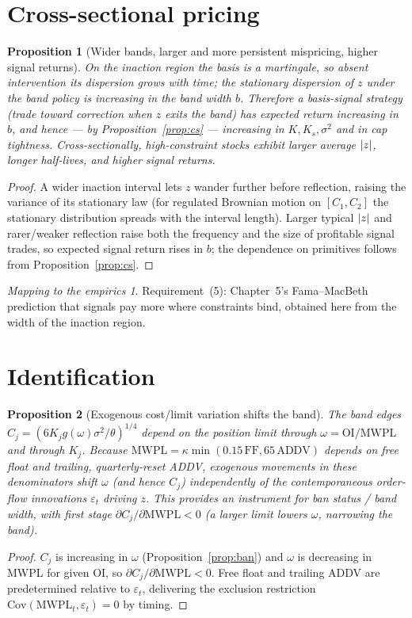 \documentclass[11pt,a4paper]{article}
\DeclarePairedDelimiter{\abs}{\lvert}{\rvert}
\theoremstyle{plain}
\newtheorem{proposition}{Proposition}
\theoremstyle{definition}
\theoremstyle{remark}
\newtheorem*{takeaway}{Mapping to the empirics}
\begin{document}
\section{Cross-sectional pricing}\label{sec:xs}
\begin{proposition}[Wider bands, larger and more persistent mispricing, higher signal returns]\label{prop:xs}
On the inaction region the basis is a martingale, so absent intervention its dispersion grows with time; the stationary dispersion of $z$ under the band policy is increasing in the band width $b$. Therefore a basis-signal strategy (trade toward correction when $z$ exits the band) has expected return increasing in $b$, and hence --- by Proposition~\ref{prop:cs} --- increasing in $K,K_s,\sigma^2$ and in cap tightness. Cross-sectionally, high-constraint stocks exhibit larger average $\abs{z}$, longer half-lives, and higher signal returns.
\end{proposition}
\begin{proof}
A wider inaction interval lets $z$ wander further before reflection, raising the variance of its stationary law (for regulated Brownian motion on $[C_1,C_2]$ the stationary distribution spreads with the interval length). Larger typical $\abs{z}$ and rarer/weaker reflection raise both the frequency and the size of profitable signal trades, so expected signal return rises in $b$; the dependence on primitives follows from Proposition~\ref{prop:cs}.
\end{proof}

\begin{takeaway}
Requirement~(5): Chapter~5's Fama--MacBeth prediction that signals pay more where constraints bind, obtained here from the width of the inaction region.
\end{takeaway}

\section{Identification}\label{sec:id}
\begin{proposition}[Exogenous cost/limit variation shifts the band]\label{prop:id}
The band edges $C_j=(6K_j g(\omega)\sigma^2/\theta)^{1/4}$ depend on the position limit through $\omega=\text{OI}/\mathrm{MWPL}$ and through $K_j$. Because $\mathrm{MWPL}=\kappa\min(0.15\,\mathrm{FF},65\,\mathrm{ADDV})$ depends on free float and \emph{trailing, quarterly-reset} ADDV, exogenous movements in these denominators shift $\omega$ (and hence $C_j$) independently of the contemporaneous order-flow innovations $\varepsilon_t$ driving $z$. This provides an instrument for ban status / band width, with first stage $\partial C_j/\partial\mathrm{MWPL}<0$ (a larger limit lowers $\omega$, narrowing the band).
\end{proposition}
\begin{proof}
$C_j$ is increasing in $\omega$ (Proposition~\ref{prop:ban}) and $\omega$ is decreasing in MWPL for given OI, so $\partial C_j/\partial\mathrm{MWPL}<0$. Free float and trailing ADDV are predetermined relative to $\varepsilon_t$, delivering the exclusion restriction $\mathrm{Cov}(\mathrm{MWPL}_t,\varepsilon_t)=0$ by timing.
\end{proof}
\end{document}
